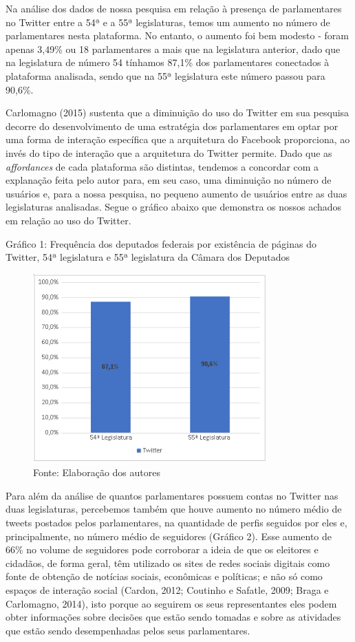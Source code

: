 Na análise dos dados de nossa pesquisa em relação à presença de
parlamentares no Twitter entre a 54ª e a 55ª legislaturas, temos um
aumento no número de parlamentares nesta plataforma. No entanto, o
aumento foi bem modesto - foram apenas 3,49\% ou 18 parlamentares a mais
que na legislatura anterior, dado que na legislatura de número 54
tínhamos 87,1\% dos parlamentares conectados à plataforma analisada,
sendo que na 55ª legislatura este número passou para 90,6\%.

Carlomagno (2015) sustenta que a diminuição do uso do Twitter em sua
pesquisa decorre do desenvolvimento de uma estratégia dos parlamentares
em optar por uma forma de interação específica que a arquitetura do
Facebook proporciona, ao invés do tipo de interação que a arquitetura do
Twitter permite. Dado que as \emph{affordances} de cada plataforma são
distintas, tendemos a concordar com a explanação feita pelo autor para,
em seu caso, uma diminuição no número de usuários e, para a nossa
pesquisa, no pequeno aumento de usuários entre as duas legislaturas
analisadas. Segue o gráfico abaixo que demonstra os nossos achados em
relação ao uso do Twitter.

Gráfico 1: Frequência dos deputados federais por existência de páginas
do Twitter, 54ª legislatura e 55ª legislatura da Câmara dos Deputados

\begin{figure}[!ht]
\centering
 \includegraphics[width=90mm]{./imgs/graf2_1.png}
\caption{Fonte: Elaboração dos autores}
\end{figure}

Para além da análise de quantos parlamentares possuem contas no Twitter
nas duas legislaturas, percebemos também que houve aumento no número
médio de tweets postados pelos parlamentares, na quantidade de perfis
seguidos por eles e, principalmente, no número médio de seguidores
(Gráfico 2). Esse aumento de 66\% no volume de seguidores pode
corroborar a ideia de que os eleitores e cidadãos, de forma geral, têm
utilizado os sites de redes sociais digitais como fonte de obtenção de
notícias sociais, econômicas e políticas; e não só como espaços de
interação social (Cardon, 2012; Coutinho e Safatle, 2009; Braga e
Carlomagno, 2014), isto porque ao seguirem os seus representantes eles
podem obter informações sobre decisões que estão sendo tomadas e sobre
as atividades que estão sendo desempenhadas pelos seus parlamentares.


